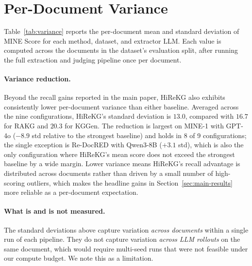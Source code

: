 \documentclass[11pt]{article}
\begin{document}
\section{Per-Document Variance}
\label{app:variance}



Table~\ref{tab:variance} reports the per-document mean and standard deviation of MINE Score for each method, dataset, and extractor LLM. Each value is computed across the documents in the dataset's evaluation split, after running the full extraction and judging pipeline once per document.


\paragraph{Variance reduction.} Beyond the recall gains reported in the main paper, HiReKG also exhibits consistently lower per-document variance than either baseline. Averaged across the nine configurations, HiReKG's standard deviation is $13.0$, compared with $16.7$ for RAKG and $20.3$ for KGGen. The reduction is largest on MINE-1 with GPT-4o ($-8.9$ std relative to the strongest baseline) and holds in 8 of 9 configurations; the single exception is Re-DocRED with Qwen3-8B ($+3.1$ std), which is also the only configuration where HiReKG's mean score does not exceed the strongest baseline by a wide margin. Lower variance means HiReKG's recall advantage is distributed across documents rather than driven by a small number of high-scoring outliers, which makes the headline gains in Section~\ref{sec:main-results} more reliable as a per-document expectation.

\paragraph{What is and is not measured.} The standard deviations above capture variation \emph{across documents} within a single run of each pipeline. They do not capture variation \emph{across LLM rollouts} on the same document, which would require multi-seed runs that were not feasible under our compute budget. We note this as a limitation.
\end{document}
